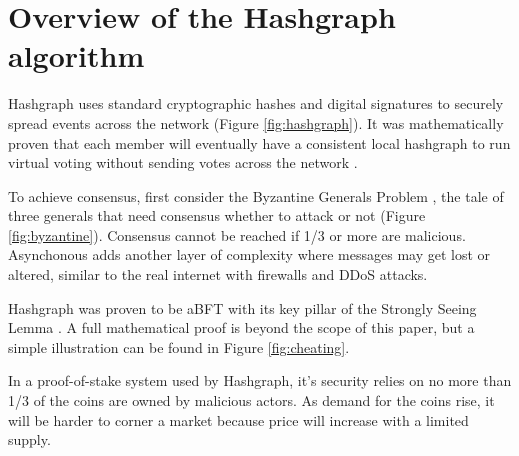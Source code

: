 \section{Overview of the Hashgraph algorithm}



Hashgraph uses standard cryptographic hashes and digital signatures to securely spread events across the network (Figure \ref{fig:hashgraph}). It was mathematically proven that each member will eventually have a consistent local hashgraph to run virtual voting without sending votes across the network \cite{baird2016}.


To achieve consensus, first consider the Byzantine Generals Problem \cite{shostak1982byzantine}, the tale of three generals that need consensus whether to attack or not (Figure \ref{fig:byzantine}). Consensus cannot be reached if 1/3 or more are malicious. Asynchonous adds another layer of complexity where messages may get lost or altered, similar to the real internet with firewalls and DDoS attacks.



Hashgraph was proven to be aBFT with its key pillar of the Strongly Seeing Lemma \cite{baird2016}. A full mathematical proof is beyond the scope of this paper, but a simple illustration can be found in Figure \ref{fig:cheating}.

In a proof-of-stake system used by Hashgraph, it's security relies on no more than 1/3 of the coins are owned by malicious actors. As demand for the coins rise, it will be harder to corner a market because price will increase with a limited supply.

